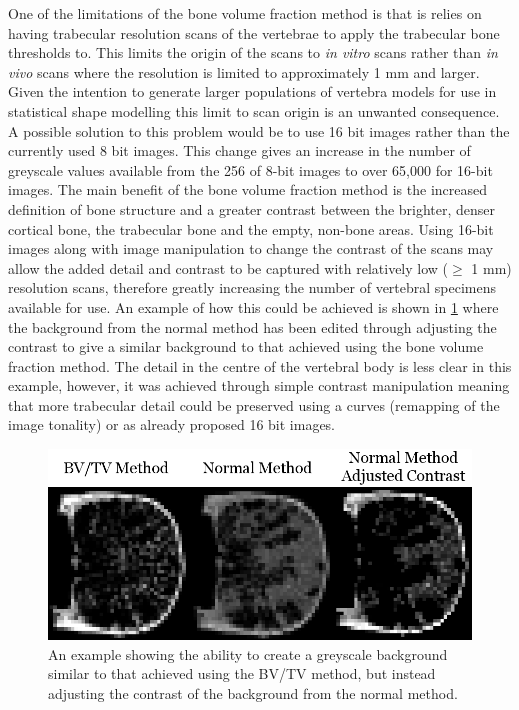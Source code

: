 One of the limitations of the bone volume fraction method is that is relies on
having trabecular resolution scans of the vertebrae to apply the trabecular
bone thresholds to.  This limits the origin of the scans to \textit{in vitro}
scans rather than \textit{in vivo} scans where the resolution is limited to
approximately 1 mm and larger.  Given the intention to generate larger
populations of vertebra models for use in statistical shape modelling this
limit to scan origin is an unwanted consequence.  A possible solution to this
problem would be to use 16 bit images rather than the currently used 8 bit
images.  This change gives an increase in the number of greyscale values
available from the 256 of 8-bit images to over 65,000 for 16-bit images.  The
main benefit of the bone volume fraction method is the increased definition of
bone structure and a greater contrast between the brighter, denser cortical
bone, the trabecular bone and the empty, non-bone areas.  Using 16-bit images
along with image manipulation to change the contrast of the scans may allow the
added detail and contrast to be captured with relatively low ($\geq$ 1 mm)
resolution scans, therefore greatly increasing the number of vertebral
specimens available for use. An example of how this could be achieved is shown
in \cref{fig:adding_contrast} where the background from the normal method has
been edited through adjusting the contrast to give a similar background to that
achieved using the bone volume fraction method. The detail in the centre of the
vertebral body is less clear in this example, however, it was achieved through
simple contrast manipulation meaning that more trabecular detail could be
preserved using a curves (remapping of the image tonality) or as already
proposed 16 bit images.

\begin{figure}[h!]
\centering
\includegraphics[width=.65\textwidth]{Chapters/Chapter_HT_images/adding_contrast.png}
\caption{An example showing the ability to create a greyscale background
similar to that achieved using the BV/TV method, but instead adjusting the
contrast of the background from the normal method.}
\label{fig:adding_contrast}
\end{figure}

